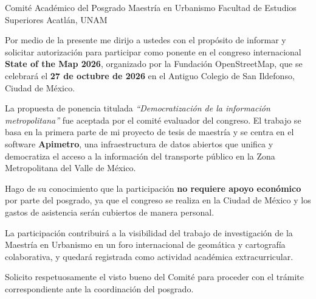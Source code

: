 
\DatosDestinatario
  {Comité Académico del Posgrado}
  {Maestría en Urbanismo}
  {Facultad de Estudios Superiores Acatlán, UNAM}



Por medio de la presente me dirijo a ustedes con el propósito de informar y
solicitar autorización para participar como ponente en el congreso internacional
\textbf{State of the Map 2026}, organizado por la Fundación OpenStreetMap, que
se celebrará el \textbf{27 de octubre de 2026} en el Antiguo Colegio de San
Ildefonso, Ciudad de México.


La propuesta de ponencia titulada \textit{``Democratización de la información
metropolitana''} fue aceptada por el comité evaluador del congreso.  El trabajo
se basa en la primera parte de mi proyecto de tesis de maestría y se centra en
el software \textbf{Apimetro}, una infraestructura de datos abiertos que unifica
y democratiza el acceso a la información del transporte público en la Zona
Metropolitana del Valle de México.


Hago de su conocimiento que la participación \textbf{no requiere apoyo
económico} por parte del posgrado, ya que el congreso se realiza en la Ciudad
de México y los gastos de asistencia serán cubiertos de manera personal.

La participación contribuirá a la visibilidad del trabajo de investigación de
la Maestría en Urbanismo en un foro internacional de geomática y cartografía
colaborativa, y quedará registrada como actividad académica extracurricular.

Solicito respetuosamente el visto bueno del Comité para proceder con el trámite
correspondiente ante la coordinación del posgrado.

\vspace{0.8cm}

